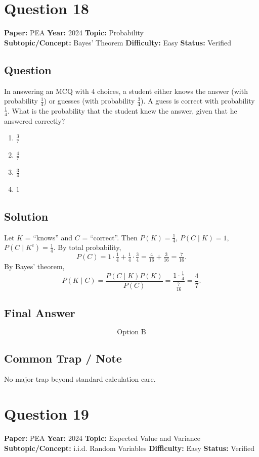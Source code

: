 \documentclass[11pt]{article}
\begin{document}
\section*{Question 18}
\textbf{Paper:} PEA \quad \textbf{Year:} 2024 \quad \textbf{Topic:} Probability \\
\textbf{Subtopic/Concept:} Bayes' Theorem \quad \textbf{Difficulty:} Easy \quad \textbf{Status:} Verified

\subsection*{Question}
In answering an MCQ with $4$ choices, a student either knows the answer (with probability $\tfrac14$) or guesses (with probability $\tfrac34$). A guess is correct with probability $\tfrac14$. What is the probability that the student knew the answer, given that he answered correctly?
\begin{enumerate}[label=(\Alph*)]
\item $\tfrac{3}{7}$
\item $\tfrac{4}{7}$
\item $\tfrac{3}{4}$
\item $1$
\end{enumerate}

\subsection*{Solution}
Let $K$ = ``knows'' and $C$ = ``correct''. Then $P(K)=\tfrac14$, $P(C\mid K)=1$, $P(C\mid K^{c})=\tfrac14$. By total probability,
\[
P(C)=1\cdot\tfrac{1}{4}+\tfrac{1}{4}\cdot\tfrac{3}{4}=\tfrac{4}{16}+\tfrac{3}{16}=\tfrac{7}{16}.
\]
By Bayes' theorem,
\[
P(K\mid C)=\frac{P(C\mid K)P(K)}{P(C)}=\frac{1\cdot\tfrac14}{\tfrac{7}{16}}=\frac{4}{7}.
\]

\subsection*{Final Answer}
\[
\boxed{\text{Option B}}
\]

\subsection*{Common Trap / Note}
No major trap beyond standard calculation care.

\section*{Question 19}
\textbf{Paper:} PEA \quad \textbf{Year:} 2024 \quad \textbf{Topic:} Expected Value and Variance \\
\textbf{Subtopic/Concept:} i.i.d. Random Variables \quad \textbf{Difficulty:} Easy \quad \textbf{Status:} Verified
\end{document}
